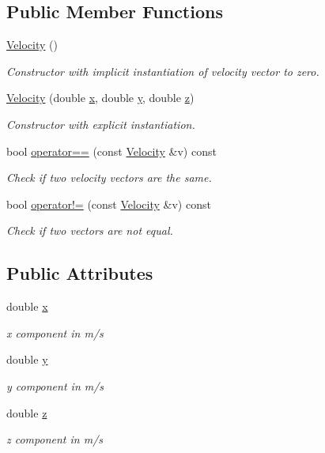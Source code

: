 \subsection*{Public Member Functions}
\begin{DoxyCompactItemize}
\item 
\hyperlink{structVelocity_a852088c8d4dbb7e1beb0d793a57e9d11}{Velocity} ()
\begin{DoxyCompactList}\small\item\em Constructor with implicit instantiation of velocity vector to zero. \end{DoxyCompactList}\item 
\hyperlink{structVelocity_adb5f7fd7a3e1811b44c9b4020c31987c}{Velocity} (double \hyperlink{structVelocity_a99a9f9580c8a025a2c7a18890993b56a}{x}, double \hyperlink{structVelocity_ae1282d20e14cc4be4aac24ab4e1e3e5c}{y}, double \hyperlink{structVelocity_aaebcd198674f7adcb61f9bb981dab465}{z})
\begin{DoxyCompactList}\small\item\em Constructor with explicit instantiation. \end{DoxyCompactList}\item 
bool \hyperlink{structVelocity_a4d148dc8c7581af4a1a16116ec3d403a}{operator==} (const \hyperlink{structVelocity}{Velocity} \&v) const 
\begin{DoxyCompactList}\small\item\em Check if two velocity vectors are the same. \end{DoxyCompactList}\item 
bool \hyperlink{structVelocity_a8aaa79fd50b42d41e06033be8baf4c80}{operator!=} (const \hyperlink{structVelocity}{Velocity} \&v) const 
\begin{DoxyCompactList}\small\item\em Check if two vectors are not equal. \end{DoxyCompactList}\end{DoxyCompactItemize}
\subsection*{Public Attributes}
\begin{DoxyCompactItemize}
\item 
double \hyperlink{structVelocity_a99a9f9580c8a025a2c7a18890993b56a}{x}
\begin{DoxyCompactList}\small\item\em x component in m/s \end{DoxyCompactList}\item 
double \hyperlink{structVelocity_ae1282d20e14cc4be4aac24ab4e1e3e5c}{y}
\begin{DoxyCompactList}\small\item\em y component in m/s \end{DoxyCompactList}\item 
double \hyperlink{structVelocity_aaebcd198674f7adcb61f9bb981dab465}{z}
\begin{DoxyCompactList}\small\item\em z component in m/s \end{DoxyCompactList}\end{DoxyCompactItemize}


